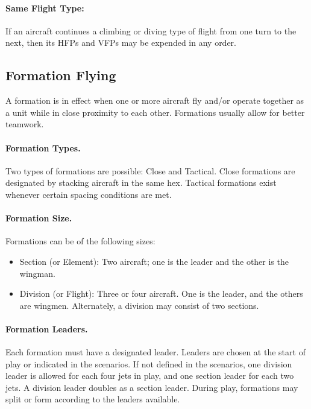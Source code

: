 \paragraph{Same Flight Type:} If an aircraft continues a climbing or diving type of flight from one turn to the next, then its HFPs and VFPs may be expended in any order.

\subsection{Formation Flying}

A formation is in effect when one or more aircraft fly and/or operate together as a unit while in close proximity to each other. Formations usually allow for better teamwork.

\paragraph{Formation Types.} Two types of formations are possible: Close and Tactical. Close formations are designated by stacking aircraft in the same hex. Tactical formations exist whenever certain spacing conditions are met.

\paragraph{Formation Size.} Formations can be of the following sizes:

\begin{itemize}
    \item Section (or Element): Two aircraft; one is the leader and the other is the wingman.
    \item Division (or Flight): Three or four aircraft. One is the leader, and the others are wingmen. Alternately, a division may consist of two sections.
\end{itemize}

\paragraph{Formation Leaders.} Each formation must have a designated leader. Leaders are chosen at the start of play or indicated in the scenarios.  If not defined in the scenarios, one division leader is allowed for each four jets in play, and one section leader for each two jets. A division leader doubles as a section leader. During play, formations may split or form according to the leaders available.

